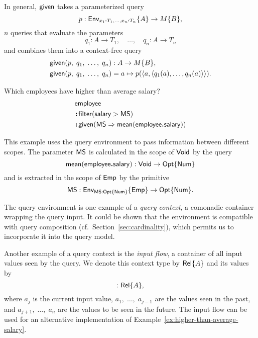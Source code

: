 In general, $\mathsf{given}$ takes a parameterized query
\begin{equation*}
    p : \mathsf{Env}_{x_1:T_1,\ldots,x_n:T_n}{\left\{A\right\}} \to M{\left\{B\right\}},
\end{equation*}
$n$ queries that evaluate the parameters
\begin{equation*}
    q_1 : A \to T_1,\quad \ldots,\quad q_n : A \to T_n
\end{equation*}
and combines them into a context-free query
\begin{align*}
    & \mathsf{given}(p,\; q_1,\; \ldots,\; q_n) : A \to M{\left\{B\right\}}, \\
    & \mathsf{given}(p,\; q_1,\; \ldots,\; q_n) = a \mapsto p(\langle a, \langle q_1(a), \ldots, q_n(a) \rangle \rangle).
\end{align*}

\begin{demo}
    \label{ex:higher-than-average-salary}
    Which employees have higher than average salary?
    \begin{align*}
        & \mathsf{employee} \\
        & \!\boldsymbol{:}\!\mathsf{filter}(\mathsf{salary} > \mathsf{MS}) \\
        & \!\boldsymbol{:}\!\mathsf{given}(\mathsf{MS} \Rightarrow \mathsf{mean}(\mathsf{employee}\boldsymbol{.}\mathsf{salary}))
    \end{align*}
\end{demo}

This example uses the query environment to pass information between different
scopes.  The parameter $\mathsf{MS}$ is calculated in the scope of $\mathsf{Void}$ by
the query
\begin{equation*}
    \mathsf{mean}(\mathsf{employee}\boldsymbol{.}\mathsf{salary}) : \mathsf{Void} \to \mathsf{Opt}{\left\{\mathsf{Num}\right\}}
\end{equation*}
and is extracted in the scope of $\mathsf{Emp}$ by the primitive
\begin{equation*}
    \mathsf{MS} : \mathsf{Env}_{\mathsf{MS}:\mathsf{Opt}{\left\{\mathsf{Num}\right\}}}{\left\{\mathsf{Emp}\right\}} \to \mathsf{Opt}{\left\{\mathsf{Num}\right\}}.
\end{equation*}

The query environment is one example of a \emph{query context}, a comonadic
container wrapping the query input.  It could be shown that the environment is
compatible with query composition (cf.~Section~\ref{sec:cardinality}), which
permits us to incorporate it into the query model.

Another example of a query context is the \emph{input flow}, a container of all
input values seen by the query.  We denote this context type by $\mathsf{Rel}{\left\{A\right\}}$ and
its values by
\begin{equation*}
    [a_1,\;\ldots,\selected{a_j},\;\ldots,\;a_n] : \Rel{A},
\end{equation*}
where $a_j$ is the current input value, $a_1,\;\ldots,\;a_{j-1}$ are the values
seen in the past, and $a_{j+1},\;\ldots,\;a_n$ are the values to be seen in the
future.  The input flow can be used for an alternative implementation of
Example~\ref{ex:higher-than-average-salary}.

